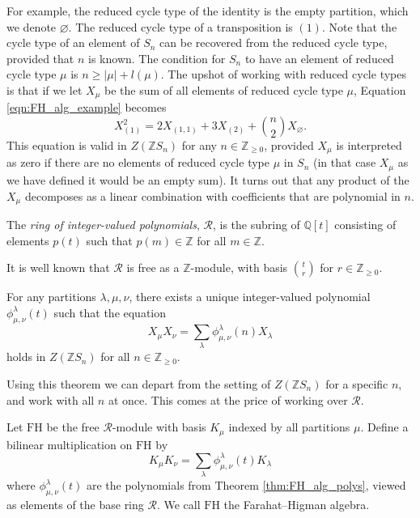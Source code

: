 \documentclass[ALCO,Unicode]{cedram}
\newcommand{\FH}{\mathrm{FH}}
\newcommand{\FH}{\mathrm{FH}}
\begin{document}
For example, the reduced cycle type of the identity is the empty partition, which we denote $\varnothing$. The reduced cycle type of a transposition is $(1)$. Note that the cycle type of an element of $S_n$ can be recovered from the reduced cycle type, provided that $n$ is known. The condition for $S_n$ to have an element of reduced cycle type $\mu$ is $n \geq |\mu| + l(\mu)$. The upshot of working with reduced cycle types is that if we let $X_\mu$ be the sum of all elements of reduced cycle type $\mu$, Equation \eqref{eqn:FH_alg_example} becomes
\begin{equation} \label{precise_FH_alg_example}
X_{(1)}^2 = 2X_{(1,1)} + 3X_{(2)} + \binom{n}{2}X_{\varnothing}.
\end{equation}
This equation is valid in $Z(\mathbb{Z}S_n)$ for any $n \in \mathbb{Z}_{\geq 0}$, provided $X_\mu$ is interpreted as zero if there are no elements of reduced cycle type $\mu$ in $S_n$ (in that case $X_\mu$ as we have defined it would be an empty sum). It turns out that any product of the $X_\mu$ decomposes as a linear combination with coefficients that are polynomial in $n$.

\begin{definition}
The \emph{ring of integer-valued polynomials}, $\mathcal{R}$, is the subring of $\mathbb{Q}[t]$ consisting of elements $p(t)$ such that $p(m) \in \mathbb{Z}$ for all $m \in \mathbb{Z}$.
\end{definition}

It is well known that $\mathcal{R}$ is free as a $\mathbb{Z}$-module, with basis $\binom{t}{r}$ for $r \in \mathbb{Z}_{\geq 0}$.

\begin{theorem} \label{thm:FH_alg_polys}
For any partitions $\lambda, \mu, \nu$, there exists a unique integer-valued polynomial $\phi_{\mu, \nu}^\lambda(t)$ such that the equation
\[
X_\mu X_\nu = \sum_\lambda \phi_{\mu, \nu}^\lambda(n)X_\lambda
\]
holds in $Z(\mathbb{Z}S_n)$ for all $n \in \mathbb{Z}_{\geq 0}$.
\end{theorem}

Using this theorem we can depart from the setting of $Z(\mathbb{Z}S_n)$ for a specific $n$, and work with all $n$ at once. This comes at the price of working over $\mathcal{R}$.

\begin{definition} \label{def:FH_alg}
Let $\FH$ be the free $\mathcal{R}$-module with basis $K_\mu$ indexed by all partitions $\mu$. 
Define a bilinear multiplication on $\FH$ by
\[
K_\mu K_\nu = \sum_{\lambda} \phi_{\mu, \nu}^\lambda(t) K_\lambda
\]
where $\phi_{\mu, \nu}^\lambda(t)$ are the polynomials from Theorem \ref{thm:FH_alg_polys}, viewed as elements of the base ring $\mathcal{R}$. 
We call $\FH$ the Farahat--Higman algebra.
\end{definition}
\end{document}
